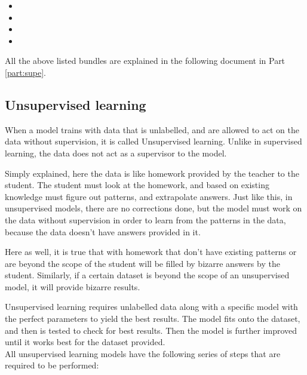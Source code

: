 \begin{itemize}
    \item {}
    \item {}
    \item {}
    \item {}
\end{itemize}

All the above listed bundles are explained in the following document in Part \ref{part:supe}.

\subsection{Unsupervised learning}\label{subsec:unsupe}

When a model trains with data that is unlabelled, and are allowed to act on the data without supervision, it is called Unsupervised learning. Unlike in supervised learning, the data does not act as a supervisor to the model.

Simply explained, here the data is like homework provided by the teacher to the student. The student must look at the homework, and based on existing knowledge must figure out patterns, and extrapolate answers. Just like this, in unsupervised models, there are no corrections done, but the model must work on the data without supervision in order to learn from the patterns in the data, because the data doesn't have answers provided in it. 

Here as well, it is true that with homework that don't have existing patterns or are beyond the scope of the student will be filled by bizarre answers by the student. Similarly, if a certain dataset is beyond the scope of an unsupervised model, it will provide bizarre results.

Unsupervised learning requires unlabelled data along with a specific model with the perfect parameters to yield the best results. The model fits onto the dataset, and then is tested to check for best results. Then the model is further improved until it works best for the dataset provided.
\\

All unsupervised learning models have the following series of steps that are required to be performed:


